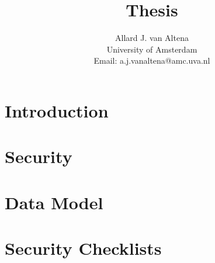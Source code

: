 \documentclass[a4paper]{report}
\title{Thesis}
\author{
	Allard J. van Altena\\
	University of Amsterdam\\
	Email: a.j.vanaltena@amc.uva.nl
}
\begin{document}
	
	
	\chapter{Introduction}
	\label{introduction}
	
	
	\chapter{Security}
	\label{security}
	
	
	
	
	\chapter{Data Model}
	\label{data-model}
	
	
	\clearpage
	
	\printbibliography
	
	\appendix
	\chapter{Security Checklists}
	\label{security-appendix}
	
\end{document}

